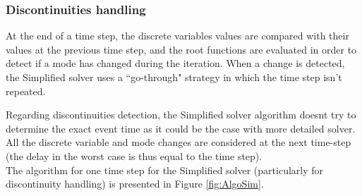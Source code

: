 \documentclass[a4paper, 12pt]{report}
\begin{document}
\subsubsection{Discontinuities handling}

At the end of a time step, the discrete variables values are compared with their values at the previous time step, and the root functions are evaluated in order to detect if a mode has changed during the iteration. When a change is detected, the Simplified solver uses a ``go-through" strategy in which the time step isn't repeated.

Regarding discontinuities detection, the Simplified solver algorithm doesn\textquotesingle t try to determine the exact event time as it could be the case with more detailed solver. All the discrete variable and mode changes are considered at the next  time-step (the delay in the worst case is thus equal to the time step). \\

The algorithm for one time step for the Simplified solver (particularly for discontinuity handling) is presented in Figure \ref{fig:AlgoSim}.
\end{document}
